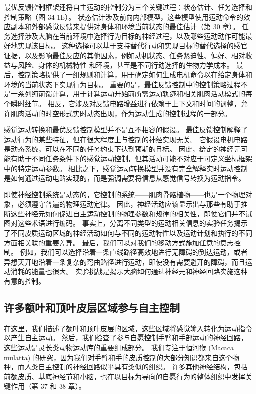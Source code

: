 最优反馈控制框架还将自主运动的控制分为三个关键过程：状态估计、任务选择和控制策略（图 34-1B）。 状态估计涉及前向内部模型，这些模型使用运动命令的效应副本和外部感觉反馈来提供对身体和环境当前状态的最佳估计（第 30 章）。 任务选择涉及大脑在当前环境中选择行为目标的神经过程，以及哪些运动动作可能最好地实现该目标。 这种选择可以基于支持替代行动和实现目标的替代选择的感官证据，以及影响最佳反应的其他因素，例如动机状态、任务紧迫性、偏好、相对收益与风险、身体的机械特性 和环境，甚至是不同行动选择的生物力学成本。 最后，控制策略提供了一组规则和计算，用于确定如何生成电机命令以在给定身体和环境的当前状态下实现行为目标。 重要的是，最佳反馈控制中的控制策略过程不是一系列纯前馈计算，用于计算运动开始前所需运动轨迹和相关肌肉活动模式的每个瞬时细节。 相反，它涉及对反馈电路增益进行依赖于上下文和时间的调整，允许肌肉活动的时空形式实时动态出现，作为运动生成的控制过程的一部分。

感觉运动转换和最优反馈控制模型并不是互不相容的假设。 最佳反馈控制解释了运动行为的某些特征，但在很大程度上与控制的神经实现无关。 它假设电机电路是动态系统，可以在不同的任务约束下达到预期的目标。 因此，给定的神经元可能有助于不同任务条件下的感觉运动控制，但其活动可能不对应于可定义坐标框架中的特定运动参数。 相比之下，感觉运动转换模型并没有完全解释实时运动控制是如何通过运动电路实现的，而是强调需要将信息从感觉信号转换为运动指令。

即使神经控制系统是动态的，它控制的系统——肌肉骨骼植物——也是一个物理对象，必须遵守普遍的物理运动定律。 因此，神经活动应该显示出与那些有助于推断这些神经元如何促进自主运动控制的物理参数和规律的相关性，即使它们并不试图对这些术语进行编码。 事实上，分离不同类型的运动相关信息的实验任务揭示了不同皮质运动区域的神经活动如何与不同的运动特性以及运动计划和执行的不同方面相关联的重要差异。 最后，我们可以对我们的移动方式施加任意的意志控制。 例如，我们可以选择沿着一条直线路径高效地进行无障碍的到达运动，或者异想天开地沿着一条复杂的弯曲路径进行运动，即使没有需要避开的障碍，而且运动消耗的能量也很大。 实验挑战是揭示大脑如何通过神经元和神经回路实施这种有意的控制。


\subsection{许多额叶和顶叶皮层区域参与自主控制}
在这里，我们描述了额叶和顶叶皮层的区域，这些区域将感觉输入转化为运动指令以产生自主运动。 然后，我们检查了参与自愿控制手臂和手部运动的神经回路，这些运动是灵长类动物运动库的重要组成部分。 我们专注于恒河猴 (Macaca mulatta) 的研究，因为我们对手臂和手的皮质控制的大部分知识都来自这个物种，而人类自主控制的神经回路似乎具有类似的组织。 许多其他神经结构，包括前额皮质、基底神经节和小脑，也在以目标为导向的自愿行为的整体组织中发挥关键作用（第 37 和 38 章）。

